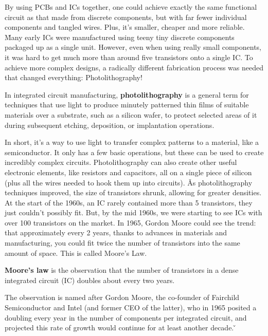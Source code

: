 
By using PCBs and ICs together, one could achieve exactly the same functional circuit as that made from discrete
components, but with far fewer individual components and tangled wires. Plus, it's smaller, cheaper and more reliable.
\v

Many early ICs were manufactured using teeny tiny discrete components packaged up as a single unit. However, even
when using really small components, it was hard to get much more than around five transistors onto a single IC. To
achieve more complex designs, a radically different fabrication process was needed that changed everything:
Photolithography!

\bd[Photolithography]
In integrated circuit manufacturing, \textbf{photolithography} is a general term for techniques that use light to
produce minutely patterned thin films of suitable materials over a substrate, such as a silicon wafer, to protect
selected areas of it during subsequent etching, deposition, or implantation operations.
\ed

In short, it's a way to use light to transfer complex patterns to a material, like a semiconductor. It only has a few
basic operations, but these can be used to create incredibly complex circuits. Photolithography can also create other
useful electronic elements, like resistors and capacitors, all on a single piece of silicon (plus all the wires
needed to hook them up into circuits). \v

As photolithography techniques improved, the size of transistors shrunk, allowing for greater densities. At the start
of the 1960s, an IC rarely contained more than 5 transistors, they just couldn't possibly fit. But, by the mid 1960s,
we were starting to see ICs with over 100 transistors on the market. In 1965, Gordon Moore could see the trend: that
approximately every 2 years, thanks to advances in materials and manufacturing, you could fit twice the number of
transistors into the same amount of space. This is called Moore's Law.

\textbf{Moore's law} is the observation that the number of transistors in a dense integrated circuit (IC) doubles about
every two years.
\ed

The observation is named after Gordon Moore, the co-founder of Fairchild Semiconductor and Intel (and former CEO of
the latter), who in 1965 posited a doubling every year in the number of components per integrated circuit, and
projected this rate of growth would continue for at least another decade. \v

